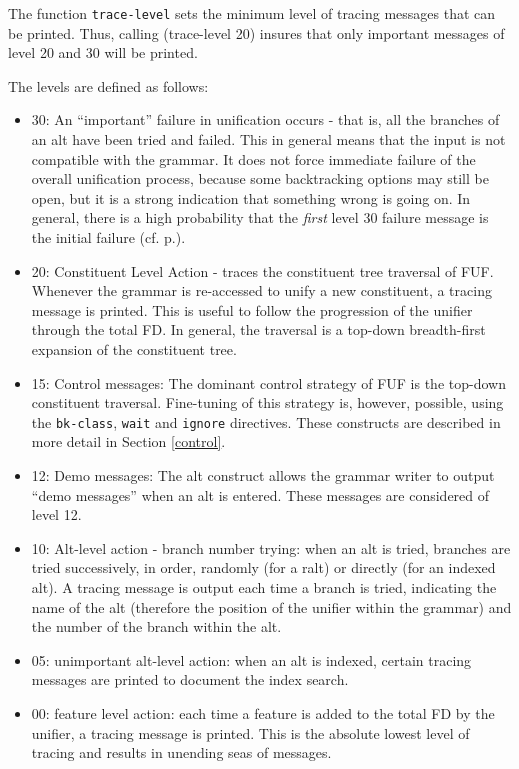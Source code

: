 \documentclass[10pt,a4paper]{report}
\begin{document}
The function {\tt trace-level} sets the minimum level of tracing messages
that can be printed.  Thus, calling (trace-level 20) insures that only
important messages of level 20 and 30 will be printed.

The levels are defined as follows:
\begin{itemize}
\item 30: An ``important'' failure in unification occurs - that is, all the
branches of an alt have been tried and failed.  This in general means that
the input is not compatible with the grammar.  It does not force immediate
failure of the overall unification process, because some backtracking
options may still be open, but it is a strong indication that something
wrong is going on.  In general, there is a high probability that the
{\em first} level 30 failure message is the initial failure (cf.
p.\pageref{initial-failure}). 

\item 20: Constituent Level Action - traces the constituent tree traversal of
FUF.  Whenever the grammar is re-accessed to unify a new constituent, a
tracing message is printed.  This is useful to follow the progression of
the unifier through the total FD.  In general, the traversal is a
top-down breadth-first expansion of the constituent tree.

\item 15: Control messages: The dominant control strategy of FUF is the top-down
constituent traversal.  Fine-tuning of this strategy is, however, possible,
using the {\tt bk-class}, {\tt wait} and {\tt ignore} directives.  These
constructs are described in more detail in Section \ref{control}.

\item 12: Demo messages: The alt construct allows the grammar writer to output
``demo messages'' when an alt is entered.  These messages are considered of
level 12.

\item 10: Alt-level action - branch number trying: when an alt is tried, branches
are tried successively, in order, randomly (for a ralt) or directly (for an
indexed alt).  A tracing message is output each time a branch is tried,
indicating the name of the alt (therefore the position of the unifier
within the grammar) and the number of the branch within the alt.

\item 05: unimportant alt-level action: when an alt is indexed, certain tracing
messages are printed to document the index search.

\item 00: feature level action: each time a feature is added to the total FD by
the unifier, a tracing message is printed.  This is the absolute lowest
level of tracing and results in unending seas of messages.
\end{itemize}
\end{document}
